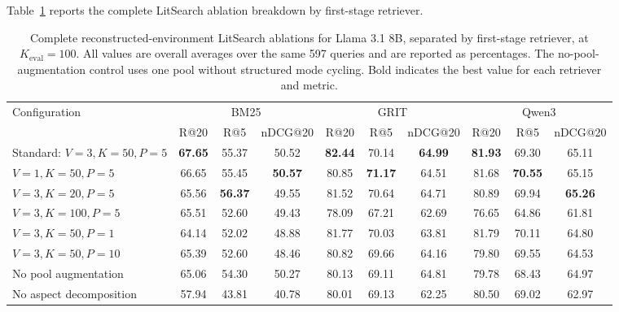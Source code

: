\documentclass[pdflatex,sn-basic,Numbered]{sn-jnl}%
\theoremstyle{thmstyleone}%
\theoremstyle{thmstyletwo}%
\theoremstyle{thmstylethree}%
\begin{document}
Table~\ref{tab:litsearch-ablation-detailed} reports the complete LitSearch ablation breakdown by first-stage retriever.

\begin{table}[htbp]


\centering
\scriptsize
\setlength{\tabcolsep}{3.2pt}
\renewcommand{\arraystretch}{1.06}
\begin{adjustbox}{max width=\linewidth}
\begin{tabular}{l c c c c c c c c c}
\hline
\multirow{2}{*}{Configuration}
 & \multicolumn{3}{c}{BM25}
 & \multicolumn{3}{c}{GRIT}
 & \multicolumn{3}{c}{Qwen3} \\
 & R@20 & R@5 & nDCG@20
 & R@20 & R@5 & nDCG@20
 & R@20 & R@5 & nDCG@20 \\
\hline
Standard: $V=3,K=50,P=5$
 & \textbf{67.65} & 55.37 & 50.52
 & \textbf{82.44} & 70.14 & \textbf{64.99}
 & \textbf{81.93} & 69.30 & 65.11 \\
$V=1,K=50,P=5$
 & 66.65 & 55.45 & \textbf{50.57}
 & 80.85 & \textbf{71.17} & 64.51
 & 81.68 & \textbf{70.55} & 65.15 \\
$V=3,K=20,P=5$
 & 65.56 & \textbf{56.37} & 49.55
 & 81.52 & 70.64 & 64.71
 & 80.89 & 69.94 & \textbf{65.26} \\
$V=3,K=100,P=5$
 & 65.51 & 52.60 & 49.43
 & 78.09 & 67.21 & 62.69
 & 76.65 & 64.86 & 61.81 \\
$V=3,K=50,P=1$
 & 64.14 & 52.02 & 48.88
 & 81.77 & 70.03 & 63.81
 & 81.79 & 70.11 & 64.80 \\
$V=3,K=50,P=10$
 & 65.39 & 52.60 & 48.46
 & 80.82 & 69.66 & 64.16
 & 79.80 & 69.55 & 64.53 \\
No pool augmentation
 & 65.06 & 54.30 & 50.27
 & 80.13 & 69.11 & 64.81
 & 79.78 & 68.43 & 64.97 \\
No aspect decomposition
 & 57.94 & 43.81 & 40.78
 & 80.01 & 69.13 & 62.25
 & 80.50 & 69.02 & 62.97 \\
\hline
\end{tabular}
\end{adjustbox}


\caption{Complete reconstructed-environment LitSearch ablations for Llama 3.1 8B,
separated by first-stage retriever, at $K_{\mathrm{eval}}=100$. All values are
overall averages over the same 597 queries and are reported as percentages.
The no-pool-augmentation control uses one pool without
structured mode cycling. Bold indicates the best value for each retriever and
metric.}
\label{tab:litsearch-ablation-detailed}
\end{table}
\end{document}
